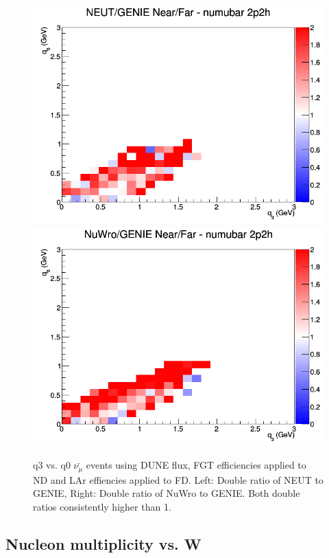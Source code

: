 \documentclass[12pt]{article}
\begin{document}
\begin{figure}[h]
\centering
{}
\includegraphics[width=\linewidth]{eff_q0_q3/FGT/ratios/2p2h_NEUT_GENIE_numubar_NF_q3_q0.png}
\endminipage
{}
\includegraphics[width=\linewidth]{eff_q0_q3/FGT/ratios/2p2h_NuWro_GENIE_numubar_NF_q3_q0.png}
\endminipage
\caption{q3 vs. q0 $\bar{\nu_{\mu}}$ events using DUNE flux, FGT efficiencies applied to ND and LAr effiencies applied to FD. Left: Double ratio of NEUT to GENIE, Right: Double ratio of NuWro to GENIE. Both double ratios consistently higher than 1.}
\label{fig:q0q3_numubar_2p2h_FGT_eff}
\end{figure}
\FloatBarrier
\subsection{Nucleon multiplicity vs. W}
\end{document}
